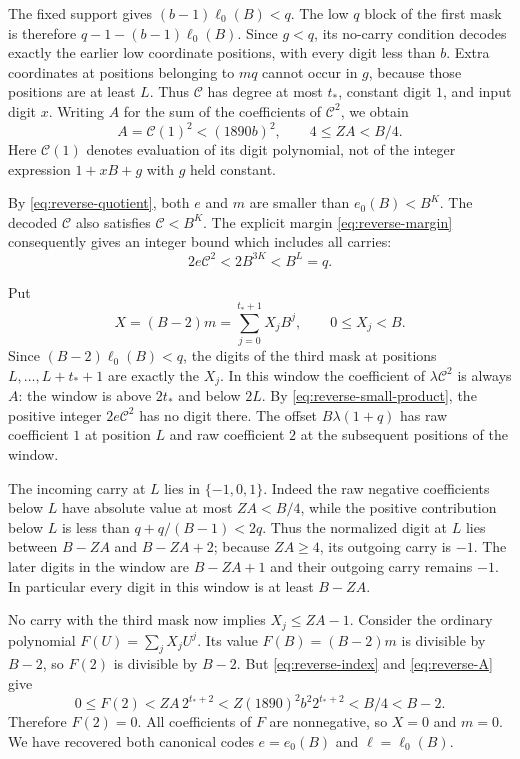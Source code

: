 The fixed support gives $(b-1)\ell_0(B)<q$. The low $q$ block of the
first mask is therefore $q-1-(b-1)\ell_0(B)$. Since $g<q$, its no-carry
condition decodes exactly the earlier low coordinate positions, with
every digit less than $b$. Extra coordinates at positions belonging to
$mq$ cannot occur in $g$, because those positions are at least $L$.
Thus $\mathcal C$ has degree at most $t_*$, constant digit $1$, and input
digit $x$. Writing $A$ for the sum of the coefficients of
$\mathcal C^2$, we obtain
\begin{equation}\label{eq:reverse-A}
 A=\mathcal C(1)^2<(1890b)^2,
 \qquad 4\le ZA<B/4.
\end{equation}
Here $\mathcal C(1)$ denotes evaluation of its digit polynomial, not of
the integer expression $1+xB+g$ with $g$ held constant.

By \eqref{eq:reverse-quotient}, both $e$ and $m$ are smaller than
$e_0(B)<B^K$. The decoded $\mathcal C$ also satisfies $\mathcal C<B^K$.
The explicit margin \eqref{eq:reverse-margin} consequently gives an
integer bound which includes all carries:
\begin{equation}\label{eq:reverse-small-product}
 2e\mathcal C^2<2B^{3K}<B^L=q.
\end{equation}

Put
\[
 X=(B-2)m=\sum_{j=0}^{t_*+1}X_jB^j,
 \qquad 0\le X_j<B.
\]
Since $(B-2)\ell_0(B)<q$, the digits of the third mask at positions
$L,\ldots,L+t_*+1$ are exactly the $X_j$. In this window the coefficient
of $\lambda\mathcal C^2$ is always $A$: the window is above $2t_*$
and below $2L$. By \eqref{eq:reverse-small-product}, the positive integer
$2e\mathcal C^2$ has no digit there. The offset
$B\lambda(1+q)$ has raw coefficient $1$ at position $L$ and raw
coefficient $2$ at the subsequent positions of the window.

The incoming carry at $L$ lies in $\{-1,0,1\}$. Indeed the raw negative
coefficients below $L$ have absolute value at most $ZA<B/4$, while the
positive contribution below $L$ is less than $q+q/(B-1)<2q$.
Thus the normalized digit at $L$ lies between $B-ZA$ and $B-ZA+2$;
because $ZA\ge4$, its outgoing carry is $-1$. The later digits in the
window are $B-ZA+1$ and their outgoing carry remains $-1$. In particular
every digit in this window is at least $B-ZA$.

No carry with the third mask now implies $X_j\le ZA-1$. Consider the
ordinary polynomial $F(U)=\sum_jX_jU^j$. Its value
$F(B)=(B-2)m$ is divisible by $B-2$, so $F(2)$ is divisible by $B-2$.
But \eqref{eq:reverse-index} and \eqref{eq:reverse-A} give
\[
 0\le F(2)<ZA\,2^{t_*+2}
       <Z(1890)^2b^2 2^{t_*+2}<B/4<B-2.
\]
Therefore $F(2)=0$. All coefficients of $F$ are nonnegative, so $X=0$
and $m=0$. We have recovered both canonical codes
$e=e_0(B)$ and $\ell=\ell_0(B)$.

